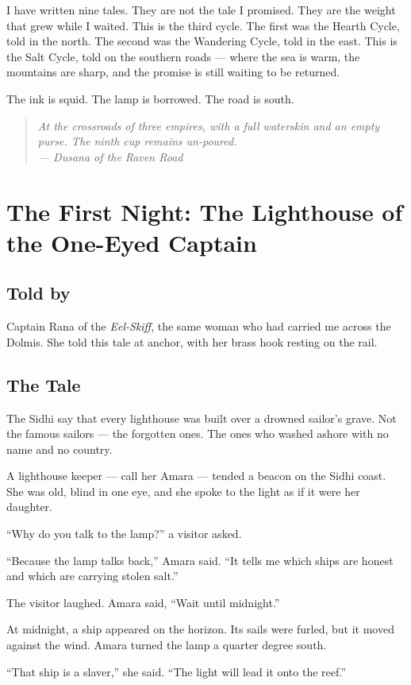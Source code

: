\documentclass[10pt,twoside]{book}
\newcommand{\dusana}[1]{\begin{quote}\itshape #1 \\ --- Dusana of the Raven Road\end{quote}}
\begin{document}
I have written nine tales. They are not the tale I promised. They are the weight that grew while I waited. This is the third cycle. The first was the Hearth Cycle, told in the north. The second was the Wandering Cycle, told in the east. This is the Salt Cycle, told on the southern roads --- where the sea is warm, the mountains are sharp, and the promise is still waiting to be returned.

The ink is squid. The lamp is borrowed. The road is south.

\dusana{At the crossroads of three empires, with a full waterskin and an empty purse. The ninth cup remains un-poured.}


\chapter{The First Night: The Lighthouse of the One-Eyed Captain}

\section*{Told by}
Captain Rana of the \textit{Eel-Skiff}, the same woman who had carried me across the Dolmis. She told this tale at anchor, with her brass hook resting on the rail.

\section*{The Tale}
The Sidhi say that every lighthouse was built over a drowned sailor's grave. Not the famous sailors --- the forgotten ones. The ones who washed ashore with no name and no country.

A lighthouse keeper --- call her Amara --- tended a beacon on the Sidhi coast. She was old, blind in one eye, and she spoke to the light as if it were her daughter.

``Why do you talk to the lamp?'' a visitor asked.

``Because the lamp talks back,'' Amara said. ``It tells me which ships are honest and which are carrying stolen salt.''

The visitor laughed. Amara said, ``Wait until midnight.''

At midnight, a ship appeared on the horizon. Its sails were furled, but it moved against the wind. Amara turned the lamp a quarter degree south.

``That ship is a slaver,'' she said. ``The light will lead it onto the reef.''
\end{document}
